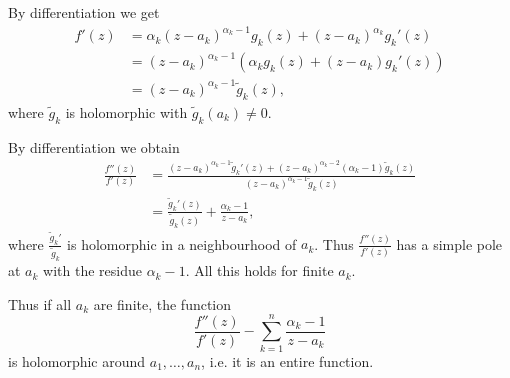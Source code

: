 \documentclass[a4paper,english]{article}
\begin{document}
\begin{pr}
    By differentiation we get
    \begin{align*}
        f'(z)
        & = \alpha_k (z - a_k)^{\alpha_k - 1} g_k(z) + (z - a_k)^{\alpha_k} g_k'(z) \\
        & = (z - a_k)^{\alpha_k - 1} (\alpha_k  g_k(z) + (z - a_k) g_k'(z)) \\
        & = (z - a_k)^{\alpha_k - 1} \tilde{g}_k(z),
    \end{align*}
    where $\tilde{g}_k$ is holomorphic with $\tilde{g}_k(a_k) \ne 0$.
    
    By differentiation we obtain
    \begin{align*}
        \frac{f''(z)}{f'(z)}
        & = \frac{ (z - a_k)^{\alpha_k - 1} \tilde{g}_k'(z) + (z - a_k)^{\alpha_k - 2} (\alpha_k - 1) \tilde{g}_k(z)}{(z - a_k)^{\alpha_k - 1} \tilde{g}_k(z)} \\
        & = \frac{\tilde{g}_k'(z)}{\tilde{g}_k(z)} + \frac{\alpha_k - 1}{z - a_k},
    \end{align*}
    where $\frac{\tilde{g}_k'}{\tilde{g}_k}$ is holomorphic in a neighbourhood of $a_k$.
    Thus $\frac{f''(z)}{f'(z)}$ has a simple pole at $a_k$ with the residue $\alpha_k - 1$.
    All this holds for finite $a_k$.
    
    Thus if all $a_k$ are finite, the function
    \begin{equation*}
        \frac{f''(z)}{f'(z)} - \sum_{k = 1}^{n} \frac{\alpha_k - 1}{z - a_k}
    \end{equation*}
    is holomorphic around $a_1, \ldots, a_n$, i.e. it is an entire function.
    

\end{pr}
\end{document}
